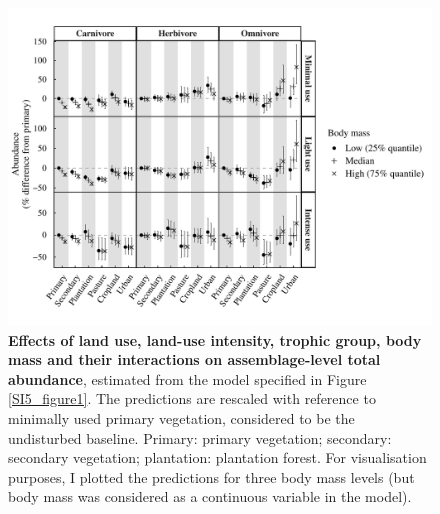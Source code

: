 \begin{figure}[h!]
\centering
\includegraphics[scale=0.9]{Supporting/Chapter5/Figures/Abundance_BM}
\caption[Effects of land use, land-use intensity, trophic group, body mass and their interactions on assemblage-level total abundance]{\textbf{Effects of land use, land-use intensity, trophic group, body mass and their interactions on assemblage-level total abundance}, estimated from the model specified in Figure \ref{SI5_figure1}. The predictions are rescaled with reference to minimally used primary vegetation, considered to be the undisturbed baseline. Primary: primary vegetation; secondary: secondary vegetation; plantation: plantation forest. For visualisation purposes, I plotted the predictions for three body mass levels (but body mass was considered as a continuous variable in the model).}
\label{SI5_figure2}
\end{figure}

